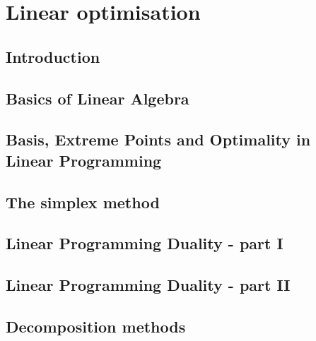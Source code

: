\documentclass{bookest}
\begin{document}
	

	\tableofcontents
	
	\part{Linear optimisation}
	
	\chapter{Introduction} \label{chapter_1}
	
	
	\chapter{Basics of Linear Algebra} \label{chapter_2}
	
	
	\chapter{Basis, Extreme Points and Optimality in Linear Programming} \label{chapter_3}
		 
	
	\chapter{The simplex method} \label{chapter_4}
		
		
	\chapter{Linear Programming Duality - part I} \label{chapter_5}
		
	
	\chapter{Linear Programming Duality - part II} \label{chapter_6}
	
	
	\chapter{Decomposition methods} \label{chapter_7}
	
	
	
\end{document}
